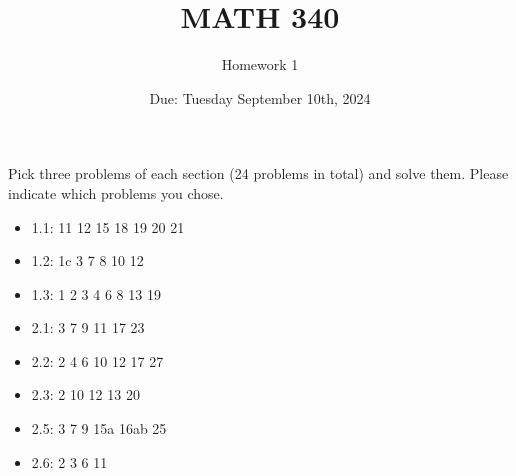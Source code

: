 \documentclass{article}
\begin{document}
\title{\huge MATH 340}
\author{\huge Homework 1}
\date{\huge Due: Tuesday September 10th, 2024}
\maketitle

{\huge
Pick three problems of each section (24 problems in total) and solve them.
Please indicate which problems you chose.

\begin{itemize}
	\item 1.1: 11 12 15 18 19 20 21
	\item 1.2: 1c 3 7 8 10 12
	\item 1.3: 1 2 3 4 6 8 13 19
	\item 2.1: 3 7 9 11 17 23
	\item 2.2: 2 4 6 10 12 17 27
	\item 2.3: 2 10 12 13 20
	\item 2.5: 3 7 9 15a 16ab 25
	\item 2.6: 2 3 6 11
\end{itemize}
}
\end{document}
